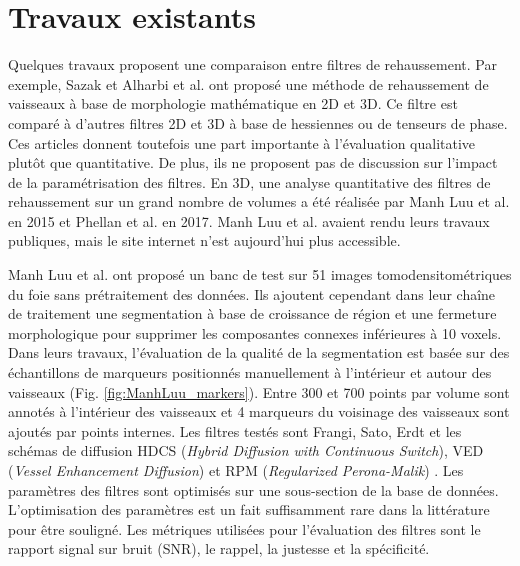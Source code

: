 \section{Travaux existants}

 Quelques travaux proposent une comparaison entre filtres de rehaussement. Par exemple, Sazak et Alharbi et al. \cite{Alharbi2018_TP_2D_3D} \cite{Sazak2019_bowler_hat_2D}  ont proposé une méthode de rehaussement de vaisseaux à base de morphologie mathématique en 2D et 3D. Ce filtre est comparé à d'autres filtres 2D et 3D à base de hessiennes ou de tenseurs de phase. Ces articles donnent toutefois une part importante à l'évaluation qualitative plutôt que quantitative. De plus, ils ne proposent pas de discussion sur l'impact de la paramétrisation des filtres. En 3D, une analyse quantitative des filtres de rehaussement sur un grand nombre de volumes a été réalisée par Manh Luu et al. en 2015 \cite{Luu2015_liver_vesselness_comparison} et Phellan et al. \cite{Phellan2017_Brain_vesselness_comparison} en 2017. Manh Luu et al. avaient rendu leurs travaux publiques, mais le site internet n'est aujourd'hui plus accessible.

Manh Luu et al. \cite{Luu2015_liver_vesselness_comparison} ont proposé un banc de test sur 51 images tomodensitométriques du foie sans prétraitement des données. Ils ajoutent cependant dans leur chaîne de traitement une segmentation à base de croissance de région et une fermeture morphologique pour supprimer les composantes connexes inférieures à 10 voxels. Dans leurs travaux, l'évaluation de la qualité de la segmentation est basée sur des échantillons de marqueurs positionnés manuellement à l'intérieur et autour des vaisseaux (Fig. \ref{fig:ManhLuu_markers}). Entre 300 et 700 points par volume sont annotés à l'intérieur des vaisseaux et 4 marqueurs du voisinage des vaisseaux sont ajoutés par points internes. Les filtres testés sont Frangi, Sato, Erdt \cite{Erdt2008_liver_vesselness} et les schémas de diffusion HDCS (\textit{Hybrid Diffusion with Continuous Switch}), VED (\textit{Vessel Enhancement Diffusion}) et RPM (\textit{Regularized Perona-Malik}) \cite{Perona1990_RPM}. Les paramètres des filtres sont optimisés sur une sous-section de la base de données. L'optimisation des paramètres est un fait suffisamment rare dans la littérature pour être souligné. Les métriques utilisées pour l'évaluation des filtres sont le rapport signal sur bruit (SNR), le rappel, la justesse et la spécificité.

